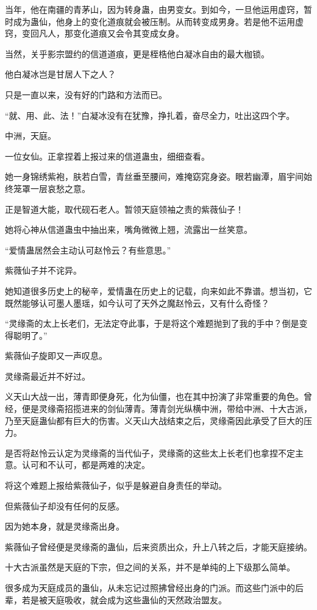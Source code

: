 \begin{this_body}
当年，他在南疆的青茅山，因为转身蛊，由男变女。到如今，一旦他运用虚窍，暂时成为蛊仙，他身上的变化道痕就会被压制。从而转变成男身。若是他不运用虚窍，变回凡人，那变化道痕又会令其变成女身。

当然，关乎影宗盟约的信道道痕，更是桎梏他白凝冰自由的最大枷锁。

他白凝冰岂是甘居人下之人？

只是一直以来，没有好的门路和方法而已。

“就、用、此、法！”白凝冰没有在犹豫，挣扎着，奋尽全力，吐出这四个字。

中洲，天庭。

一位女仙。正拿捏着上报过来的信道蛊虫，细细查看。

她一身锦绣紫袍，肤若白雪，青丝垂至腰间，难掩窈窕身姿。眼若幽潭，眉宇间始终笼罩一层哀愁之意。

正是智道大能，取代砚石老人。暂领天庭领袖之责的紫薇仙子！

她将心神从信道蛊虫中抽出来，嘴角微微上翘，流露出一丝笑意。

“爱情蛊居然会主动认可赵怜云？有些意思。”

紫薇仙子并不诧异。

她知道很多历史上的秘辛，爱情蛊在历史上的记载，向来如此不靠谱。想当初，它既然能够认可墨人墨瑶，如今认可了天外之魔赵怜云，又有什么奇怪？

“灵缘斋的太上长老们，无法定夺此事，于是将这个难题抛到了我的手中？倒是变得聪明了。”

紫薇仙子旋即又一声叹息。

灵缘斋最近并不好过。

义天山大战一出，薄青即便身死，化为仙僵，也在其中扮演了非常重要的角色。曾经，便是灵缘斋招揽进来的剑仙薄青。薄青剑光纵横中洲，带给中洲、十大古派，乃至天庭蛊仙都有巨大的伤害。义天山大战结束之后，灵缘斋因此承受了巨大的压力。

是否将赵怜云认定为灵缘斋的当代仙子，灵缘斋的这些太上长老们也拿捏不定主意。认可和不认可，都是两难的决定。

将这个难题上报给紫薇仙子，似乎是躲避自身责任的举动。

但紫薇仙子却没有任何的反感。

因为她本身，就是灵缘斋出身。

紫薇仙子曾经便是灵缘斋的蛊仙，后来资质出众，升上八转之后，才能天庭接纳。

十大古派虽然是天庭的下宗，但之间的关系，并不是单纯的上下级那么简单。

很多成为天庭成员的蛊仙，从未忘记过照拂曾经出身的门派。而这些门派中的后辈，若是被天庭吸收，就会成为这些蛊仙的天然政治盟友。


\end{this_body}
